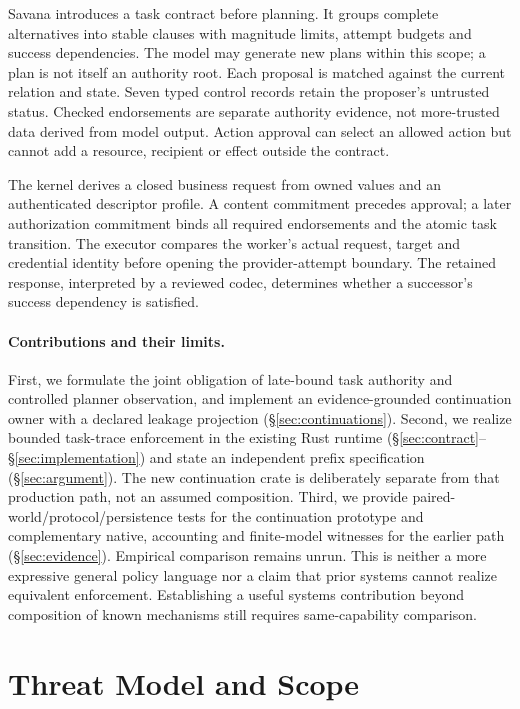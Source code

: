 \documentclass[letterpaper,twocolumn,10pt]{article}
\newcommand{\sys}{Savana}
\begin{document}
\sys{} introduces a task contract before planning. It groups complete
alternatives into stable clauses with magnitude limits, attempt budgets
and success dependencies. The model may generate new plans within this
scope; a plan is not itself an authority root. Each proposal is matched against
the current relation and state. Seven typed control records retain the
proposer's untrusted status. Checked endorsements are separate authority
evidence, not more-trusted data derived from model output. Action approval
can select an allowed action but cannot add a resource, recipient or effect
outside the contract.

The kernel derives a closed business request from owned values and an
authenticated descriptor profile. A content commitment precedes approval;
a later authorization commitment binds all required endorsements and the
atomic task transition. The executor compares the worker's actual request,
target and credential identity before opening the provider-attempt boundary.
The retained response, interpreted by a reviewed codec, determines whether
a successor's success dependency is satisfied.

\paragraph{Contributions and their limits.}
First, we formulate the joint obligation of late-bound task authority and
controlled planner observation, and implement an evidence-grounded continuation
owner with a declared leakage projection (\S\ref{sec:continuations}).
Second, we realize bounded task-trace enforcement in the existing Rust runtime
(\S\ref{sec:contract}--\S\ref{sec:implementation}) and state an independent
prefix specification (\S\ref{sec:argument}). The new continuation crate is
deliberately separate from that production path, not an assumed composition.
Third, we provide paired-world/protocol/persistence tests for the continuation
prototype and complementary native, accounting and finite-model witnesses for
the earlier path (\S\ref{sec:evidence}). Empirical comparison remains unrun.
This is neither a more expressive general policy language nor a claim that
prior systems cannot realize equivalent enforcement. Establishing a useful
systems contribution beyond composition of known mechanisms still requires
same-capability comparison.

\section{Threat Model and Scope}
\label{sec:threat}
\end{document}
